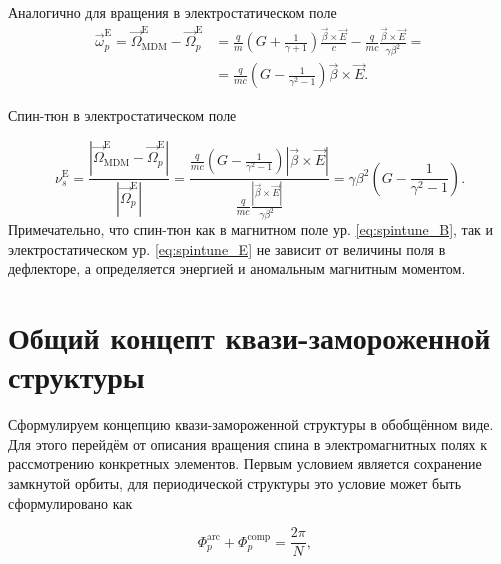 \noindent Аналогично для вращения в электростатическом поле
\begin{equation}
\begin{aligned}
{\vec{\omega}}_p^{\textrm{E}}={\vec{\Omega}}_{\textrm{MDM}}^{\textrm{E}}-{\vec{\Omega}}_p^{\textrm{E}}&=\frac{q}{m}\left(G+\frac{1}{\gamma+1}\right)\frac{\vec{\beta}\times\vec{E}}{c}-\frac{q}{mc}\frac{\vec{\beta}\times\vec{E}}{\gamma\beta^2} =\\
&=\frac{q}{mc}\left(G-\frac{1}{\gamma^2-1}\right)\vec{\beta}\times\vec{E}.
\end{aligned}
\end{equation}

\noindent Спин-тюн в электростатическом поле

\begin{equation} 
\nu_s^{\textrm{E}}=\frac{\left|{\vec{\Omega}}_{\textrm{MDM}}^{\textrm{E}}-{\vec{\Omega}}_p^{\textrm{E}}\right|}{\left|{\vec{\Omega}}_p^{\textrm{E}}\right|}=\frac{\frac{q}{mc}\left(G-\frac{1}{\gamma^2-1}\right)\left|\vec{\beta}\times\vec{E}\right|}{\frac{q}{mc}\frac{\left|\vec{\beta}\times\vec{E}\right|}{\gamma\beta^2}}=\gamma\beta^2\left(G-\frac{1}{\gamma^2-1}\right).
\label{eq:spintune_E}
\end{equation}
Примечательно, что спин-тюн как в магнитном поле ур. \ref{eq:spintune_B}, так и  электростатическом ур. \ref{eq:spintune_E} не зависит от величины поля в дефлекторе, а определяется энергией и аномальным магнитным моментом.

\section{Общий концепт квази-замороженной структуры}\label{sec:EDM/requirements/deflector}

\par Сформулируем концепцию квази-замороженной структуры в обобщённом виде. Для этого перейдём от описания вращения спина в электромагнитных полях к рассмотрению конкретных элементов. Первым условием является сохранение замкнутой орбиты, для периодической структуры это условие может быть сформулировано как

\begin{equation}
	\Phi_p^{\textrm{arc}}+\Phi_{p}^{\textrm{comp}}=\frac{2\pi}{N},\ \ \
	\label{eq:QFS_orbital}
\end{equation}

